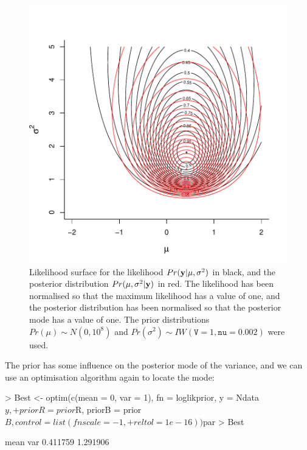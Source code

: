 \documentclass{article}
\begin{document}
\begin{figure}[!h]
\begin{center}
\includegraphics{Lecture1-034}
\end{center}
\caption{Likelihood surface for the likelihood $Pr({\bf y}|\mu, \sigma^{2})$ in black, and the posterior distribution $Pr(\mu, \sigma^{2} | {\bf y})$ in red.  The likelihood has been normalised so that the maximum likelihood has a value of one, and the posterior distribution has been normalised so that the posterior mode has a value of one. The prior distributions  $Pr(\mu)\sim N(0, 10^8)$ and  $Pr(\sigma^{2})\sim IW(\texttt{V}=1, \texttt{nu}=0.002)$ were used.}
\label{Psurface-fig}
\end{figure}


The prior has some influence on the posterior mode of the variance, and we can use an optimisation algorithm again to locate the mode:  

\begin{Schunk}
\begin{Sinput}
> Best <- optim(c(mean = 0, var = 1), fn = loglikprior, y = Ndata$y, 
+     priorR = prior$R, priorB = prior$B, control = list(fnscale = -1, 
+         reltol = 1e-16))$par
> Best
\end{Sinput}
\begin{Soutput}
    mean      var 
0.411759 1.291906 
\end{Soutput}
\end{Schunk}
\end{document}
